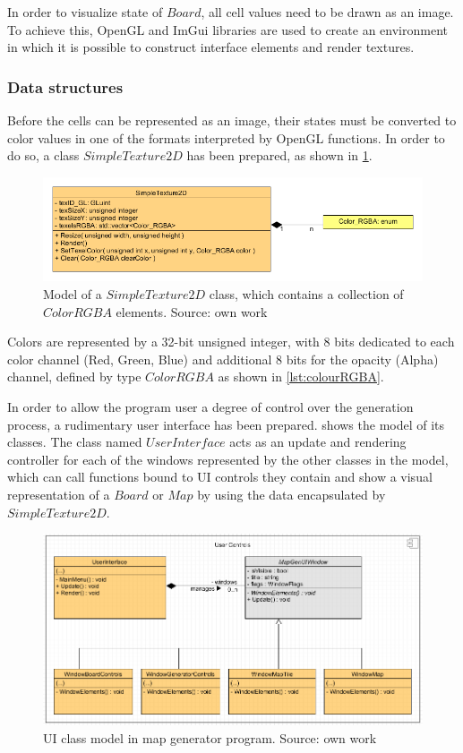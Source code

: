 \documentclass[12pt]{report}
\begin{document}
In order to visualize state of $Board$, all cell values need to be drawn as an image. To achieve this, OpenGL and ImGui libraries are used to create an environment in which it is possible to construct interface elements and render textures.    

\subsubsection{Data structures}

Before the cells can be represented as an image, their states must be converted to color values in one of the formats interpreted by OpenGL functions. In order to do so, a class $SimpleTexture2D$ has been prepared, as shown in \cref{fig:texture}. 

\begin{figure}[H]
	\centering
	\includegraphics[width=0.9\linewidth]{diagrams/texture}
	\caption{Model of a $SimpleTexture2D$ class, which contains a collection of $Color RGBA$ elements. Source: own work}
	\label{fig:texture}
\end{figure}

Colors are represented by a 32-bit unsigned integer, with 8 bits dedicated to each color channel (Red, Green, Blue) and additional 8 bits for the opacity (Alpha) channel, defined by type $Color RGBA$ as shown in \cref{lst:colourRGBA}. 



In order to allow the program user a degree of control over the generation process, a rudimentary user interface has been prepared.  shows the model of its classes. The class named $UserInterface$ acts as an update and rendering controller for each of the windows represented by the other classes in the model, which can call functions bound to UI controls they contain and show a visual representation of a $Board$ or $Map$ by using the data encapsulated by $SimpleTexture2D$.

\begin{figure}[H]
	\centering
	\includegraphics[width=0.8\linewidth]{diagrams/uiwindows}
	\caption[User Interface model]{UI class model in map generator program. Source: own work}
	\label{fig:uiwindows}
\end{figure}
\end{document}
